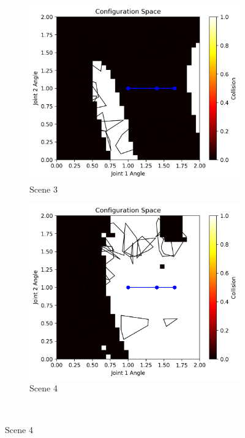 \documentclass{article}
\begin{document}
\begin{figure}[h!]
    \\
    \begin{subfigure}{0.45\textwidth}
        \includegraphics[width=\textwidth]{config_space_scene3.png}
        \caption{Scene 3}
    \end{subfigure}
    \hfill
    \begin{subfigure}{0.45\textwidth}
        \includegraphics[width=\textwidth]{config_space_scene4.png}
        \caption{Scene 4}
    \end{subfigure}
    \\

\end{figure}
\end{document}
